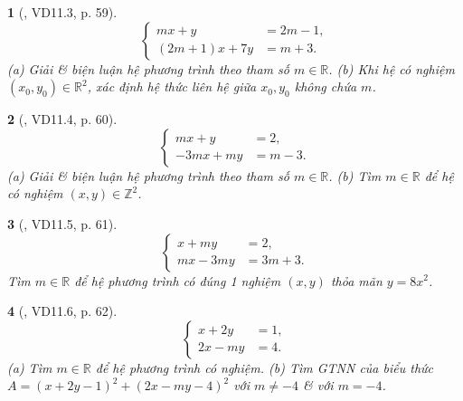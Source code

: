 \documentclass{article}
\newtheorem{baitoan}{}
\begin{document}
\begin{baitoan}[\cite{TLCT_THCS_Toan_9_dai_so}, VD11.3, p. 59]
	\begin{equation*}
		\left\{\begin{split}
			mx + y &= 2m - 1,\\
			(2m + 1)x + 7y &= m + 3.
		\end{split}\right.
	\end{equation*}
	(a) Giải \& biện luận hệ phương trình theo tham số $m\in\mathbb{R}$. (b) Khi hệ có nghiệm $(x_0,y_0)\in\mathbb{R}^2$, xác định hệ thức liên hệ giữa $x_0,y_0$ không chứa $m$.
\end{baitoan}

\begin{baitoan}[\cite{TLCT_THCS_Toan_9_dai_so}, VD11.4, p. 60]
	\begin{equation*}
		\left\{\begin{split}
			mx + y &= 2,\\
			-3mx + my &= m - 3.
		\end{split}\right.
	\end{equation*}
	(a) Giải \& biện luận hệ phương trình theo tham số $m\in\mathbb{R}$. (b) Tìm $m\in\mathbb{R}$ để hệ có nghiệm $(x,y)\in\mathbb{Z}^2$.
\end{baitoan}

\begin{baitoan}[\cite{TLCT_THCS_Toan_9_dai_so}, VD11.5, p. 61]
	\begin{equation*}
		\left\{\begin{split}
			x + my &= 2,\\
			mx - 3my &= 3m + 3.
		\end{split}\right.
	\end{equation*}
	Tìm $m\in\mathbb{R}$ để hệ phương trình có đúng 1 nghiệm $(x,y)$ thỏa mãn $y = 8x^2$.
\end{baitoan}

\begin{baitoan}[\cite{TLCT_THCS_Toan_9_dai_so}, VD11.6, p. 62]
	\begin{equation*}
		\left\{\begin{split}
			x + 2y &= 1,\\
			2x - my &= 4.
		\end{split}\right.
	\end{equation*}
	(a) Tìm $m\in\mathbb{R}$ để hệ phương trình có nghiệm. (b) Tìm {\rm GTNN} của biểu thức $A = (x + 2y - 1)^2 + (2x - my - 4)^2$ với $m\ne-4$ \& với $m = -4$.
\end{baitoan}
\end{document}
